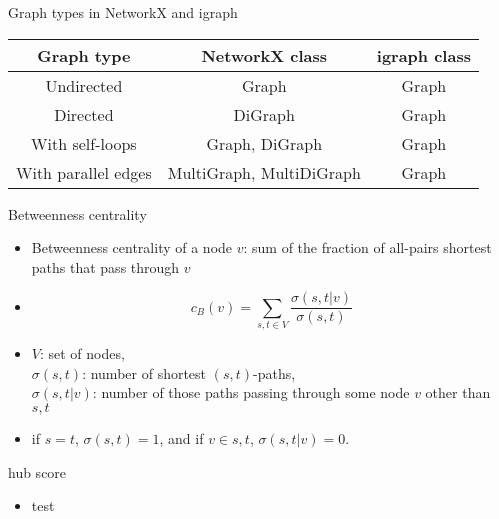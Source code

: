 \documentclass[12pt]{beamer}
\begin{document}
	\begin{frame}{Graph types in NetworkX and igraph}
		\centering
		\begin{tabular}[]{c|c|c}
			Graph type & NetworkX class & igraph class \\
			\hline
			Undirected & Graph & Graph \\
			Directed & DiGraph & Graph \\
			With self-loops & Graph, DiGraph & Graph \\
			With parallel edges & MultiGraph, MultiDiGraph & Graph
		\end{tabular}
	\end{frame}
	\begin{frame}{Betweenness centrality}
		\begin{itemize}
			\item Betweenness centrality of a node $v$: sum of the
			fraction of all-pairs shortest paths that pass through $v$
			\item 		
			\begin{equation*}
			c_B(v) =\sum_{s,t \in V} \frac{\sigma(s, t|v)}{\sigma(s, t)}
			\end{equation*}	
			\item  $V$: set of nodes,\\
			$\sigma(s, t)$: number of
			shortest $(s, t)$-paths, \\
			$\sigma(s, t|v)$: number of those
			paths  passing through some  node $v$ other than $s, t$
			\item if $s = t$, $\sigma(s, t) = 1$, and if $v \in {s, t}$,
			$\sigma(s, t|v) = 0$.
		\end{itemize}
	\end{frame}
	\begin{frame}{hub score}
		\begin{itemize}
			\item test
		\end{itemize}
	\end{frame}
\end{document}
